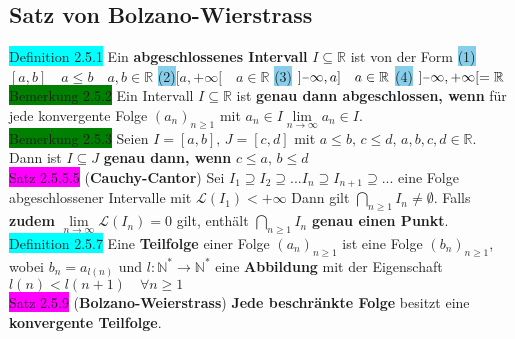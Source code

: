 \documentclass[landscape, 10pt]{article}
\newcommand{\R}{\mathbb{R}}
\newcommand{\N}{\mathbb{N}}
\begin{document}
\begin{multicols}{3}
       \subsection{Satz von Bolzano-Wierstrass}
              \colorbox{cyan}{Definition 2.5.1} 
                     Ein \textbf{abgeschlossenes Intervall} 
                     $I\subseteq\R$ ist von der Form
                     \colorbox{SkyBlue}{(1)} 
                     $[a,b]\quad a\leqslant b\quad a,b\in\R$
                     \colorbox{SkyBlue}{(2)}$[a,+\infty[\quad a\in\R$
                     \colorbox{SkyBlue}{(3)}
                     $]\scalebox{0.75}[1.0]{\(-\)}\infty,a]\quad a\in\R$
                     \colorbox{SkyBlue}{(4)} 
                     $]\scalebox{0.75}[1.0]{\(-\)}\infty,+\infty[=\R$\\
              \colorbox{green}{Bemerkung 2.5.2} 
                     Ein Intervall $I\subseteq\R$ ist \textbf{genau dann 
                     abgeschlossen, wenn} für jede konvergente Folge 
                     $(a_n)_{n\geqslant1}$ 
                     mit \textcolor{NavyBlue}{
                     $a_n\in I$\quad$\lim\limits_{n\to\infty}a_n\in I$}.\\
              \colorbox{green}{Bemerkung 2.5.3} Seien $I=[a,b],\,J=[c,d]$ mit 
                     \textcolor{NavyBlue}{
                     $a\leqslant b,\,c\leqslant d,\,a,b,c,d\in\R$}. 
                     Dann ist 
                     \textcolor{NavyBlue}{$I\subseteq J$} \textbf{genau dann, 
                     wenn} \textcolor{NavyBlue}{$c\leqslant a,\,b\leqslant d$}\\
              \colorbox{magenta}{Satz 2.5.5.5} 
              (\textbf{Cauchy-Cantor}) 
                     Sei \textcolor{NavyBlue}{
                     $I_1\supseteq I_2\supseteq ...I_n\supseteq I_{n+1}
                     \supseteq ...$} eine Folge 
                     abgeschlossener Intervalle mit 
                     \textcolor{NavyBlue}{$\mathcal{L}(I_1)<+\infty$} Dann gilt 
                     \textcolor{NavyBlue}{$\bigcap_{n\geqslant1}I_n\neq\emptyset$}. 
                     Falls \textbf{zudem}  
                     \textcolor{NavyBlue}{
                     $\lim\limits_{n\to\infty}\mathcal{L}(I_n)=0$} 
                     gilt, enthält 
                     \textcolor{NavyBlue}{$\bigcap_{n\geqslant1}I_n$} 
                     \textbf{genau einen Punkt}.\\
              \colorbox{cyan}{Definition 2.5.7} 
                     Eine \textbf{Teilfolge} einer Folge 
                     \textcolor{NavyBlue}{$(a_n)_{n\geqslant1}$}
                     ist eine Folge 
                     \textcolor{NavyBlue}{$(b_n)_{n\geqslant1}$}, wobei 
                     \textcolor{NavyBlue}{$b_n=a_{l(n)}$} und 
                     \textcolor{NavyBlue}{$l:\N^{*}\longrightarrow\N^*$} 
                     eine \textbf{Abbildung} mit der Eigenschaft 
                     \textcolor{NavyBlue}{$l(n)<l(n+1)\quad\forall n\geqslant1$}\\
              \colorbox{magenta}{Satz 2.5.9} 
              (\textbf{Bolzano-Weierstrass}) 
                     \textbf{Jede beschränkte Folge} 
                     besitzt eine \textbf{konvergente Teilfolge}.

\end{multicols}
\end{document}
